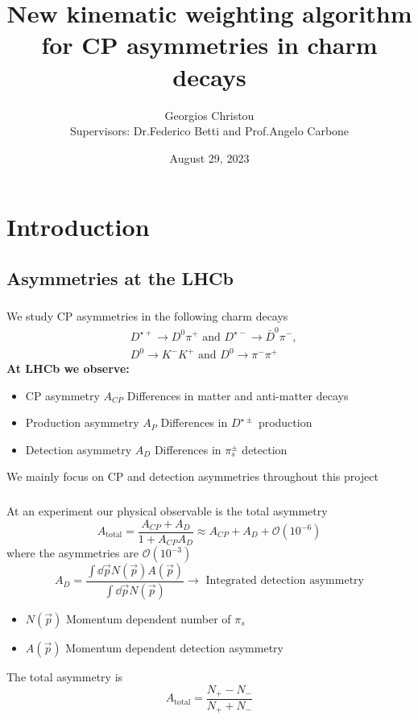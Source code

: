 \documentclass{beamer}
\title[\href{https://summerstudent.web.cern.ch/home}{CERN Summer Student Programme 2023}]
{     
      New kinematic weighting algorithm for CP asymmetries in charm decays
}
\author[\href{https://github.com/GiorgosChr}{Georgios Christou}]
{Georgios Christou
\\
Supervisors: Dr.\@ Federico Betti and Prof.\@ Angelo Carbone}
\institute[\href{https://lhcb.web.cern.ch/}{LHCb}]
{
      LHCb Collaboration
}
\date{August 29, 2023}
\begin{document}
\frame{\titlepage}
\begin{frame}
      \tableofcontents
\end{frame}

\section{Introduction}
\subsection{Asymmetries at the LHCb}

\begin{frame}
      \frametitle{\insertsubsectionhead}
      \rightarrow We study CP asymmetries in the following charm decays
      \begin{eqnarray*}
            &D^{\star+}\to D^0\pi^+ \text{ and } D^{\star-}\to \bar{D}^0\pi^-, \nonumber\\
            &D^0 \to K^-K^+ \text{ and } D^0 \to \pi^-\pi^+
    \end{eqnarray*}
      \textbf{At LHCb we observe:}
      \begin{itemize}
            \item CP asymmetry $A_{CP}$ \rightarrow Differences in matter and anti-matter decays
            \item Production asymmetry $A_{P}$ \rightarrow Differences in $D^{\star\pm}$ production
            \item Detection asymmetry $A_{D}$ \rightarrow Differences in $\pi_s^{\pm}$ detection
      \end{itemize}
      \bigbreak
      \rightarrow We mainly focus on CP and detection asymmetries throughout this project
\end{frame}

\begin{frame}
      \frametitle{\insertsubsectionhead}
      \rightarrow At an experiment our physical observable is the total asymmetry
      \begin{equation*}
            A_\text{total} = \frac{A_{CP} + A_{D}}{1 + A_{CP}A_D}\approx A_{CP} + A_{D} + \mathcal{O}(10^{-6})
      \end{equation*}
      where the asymmetries are $\mathcal{O}(10^{-3})$
      \begin{equation*}
            A_{D} = \frac{\int \dd \vec{p} N(\vec{p})A(\vec{p})}{\int \dd \vec{p} N(\vec{p})}\to \text{ Integrated detection asymmetry}
      \end{equation*}
      \begin{itemize}
            \item $N(\vec{p})$ \rightarrow Momentum dependent number of $\pi_s$
            \item $A(\vec{p})$ \rightarrow Momentum dependent detection asymmetry
      \end{itemize}
      \rightarrow The total asymmetry is
      \begin{equation*}
            A_\text{total} = \frac{N_+ - N_-}{N_+ + N_-}
      \end{equation*}
\end{frame}
\end{document}
